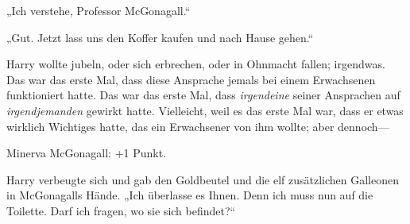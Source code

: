 „Ich verstehe, Professor McGonagall.“

„Gut. Jetzt lass uns den Koffer kaufen und nach Hause gehen.“

Harry wollte jubeln, oder sich erbrechen, oder in Ohnmacht fallen; irgendwas. Das war das erste Mal, dass diese Ansprache jemals bei einem Erwachsenen funktioniert hatte. Das war das erste Mal, dass \emph{irgendeine} seiner Ansprachen auf \emph{irgendjemanden} gewirkt hatte. Vielleicht, weil es das erste Mal war, dass er etwas wirklich Wichtiges hatte, das ein Erwachsener von ihm wollte; aber dennoch—

Minerva McGonagall: +1 Punkt.

Harry verbeugte sich und gab den Goldbeutel und die elf zusätzlichen Galleonen in McGonagalls Hände. „Ich überlasse es Ihnen. Denn ich muss nun auf die Toilette. Darf ich fragen, wo sie sich befindet?“

